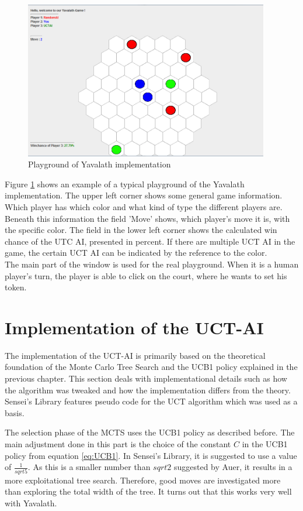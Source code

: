 \documentclass[english]{report} \usepackage[english]{babel}
\begin{document}
\begin{figure}[ht]
\centering
\includegraphics[width=0.95\textwidth]{Abbildungen/exampleOfPlayGround.png}
\caption[Playground of Yavalath implementation]{Playground of Yavalath implementation}
\label{fig:playgroundOfYav}
\end{figure} 

\noindent Figure \ref{fig:playgroundOfYav} shows an example of a typical
playground of the Yavalath implementation.
The upper left corner shows some general game information. Which player has
which color and what kind of type the different players are. Beneath this
information the field 'Move' shows, which player's move it is, with the specific
color. The field in the lower left corner shows the calculated win chance of the
UTC AI, presented in percent. If there are multiple UCT AI in the game, the
certain UCT AI can be indicated by the reference to the color.  \\
The main part of the window is used for the real playground. When it is a human
player's turn, the player is able to click on the court,
where he wants to set his 
token. 

\section{Implementation of the UCT-AI}
The implementation of the UCT-AI is primarily based on the theoretical
foundation of the Monte Carlo Tree Search and the UCB1 policy explained in the
previous chapter. This section deals with implementational details such as how
the algorithm was tweaked and how the implementation differs from the theory. 
Sensei's Library features pseudo code for the UCT algorithm which was used as a
basis.\cite{sl}


The selection phase of the MCTS uses the UCB1 policy as described before. The
main adjustment done in this part is the choice of the constant \(C\) in the
UCB1 policy from equation \ref{eq:UCB1}. In Sensei's Library, it is suggested to
use a value of \(\frac{1}{sqrt{5}}\).\cite{sl} As this is a smaller
number than \(sqrt{2}\) suggested by Auer, it results in a more exploitational
tree search. Therefore, good moves are investigated more than exploring the
total width of the tree. It turns out that this works very well with Yavalath.\\
\end{document}

